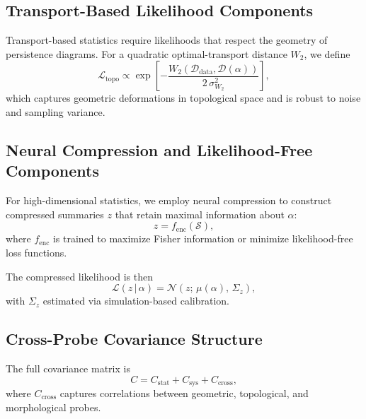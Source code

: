 \documentclass[11pt,a4paper]{article}
\begin{document}
\subsection{Transport-Based Likelihood Components}

Transport-based statistics require likelihoods that respect the geometry of
persistence diagrams. For a quadratic optimal-transport distance $W_{2}$, we
define
\begin{equation}
    \mathcal{L}_{\mathrm{topo}}
    \propto
    \exp\!\left[
        -\frac{
            W_{2}\!\left(
                \mathcal{D}_{\mathrm{data}},
                \mathcal{D}(\alpha)
            \right)
        }{
            2\,\sigma_{W_{2}}^{2}
        }
    \right],
\end{equation}
which captures geometric deformations in topological space and is robust to noise
and sampling variance.

\subsection{Neural Compression and Likelihood-Free Components}

For high-dimensional statistics, we employ neural compression to construct
compressed summaries $z$ that retain maximal information about $\alpha$:
\begin{equation}
    z = f_{\mathrm{enc}}(\mathcal{S}),
\end{equation}
where $f_{\mathrm{enc}}$ is trained to maximize Fisher information or minimize
likelihood-free loss functions.

The compressed likelihood is then
\begin{equation}
    \mathcal{L}(z\,|\,\alpha)
    =
    \mathcal{N}\!\left(
        z;\,
        \mu(\alpha),\,
        \Sigma_{z}
    \right),
\end{equation}
with $\Sigma_{z}$ estimated via simulation-based calibration.

\subsection{Cross-Probe Covariance Structure}

The full covariance matrix is
\begin{equation}
    C
    =
    C_{\mathrm{stat}}
    +
    C_{\mathrm{sys}}
    +
    C_{\mathrm{cross}},
\end{equation}
where $C_{\mathrm{cross}}$ captures correlations between geometric, topological,
and morphological probes.
\end{document}
